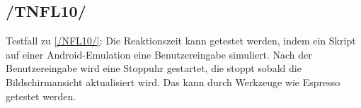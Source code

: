 \subsection*{/TNFL10/}
\label{/TNFL10/} Testfall zu \ref{/NFL10/}: Die Reaktionszeit kann getestet werden, indem ein \Gls{Skript} auf einer \Gls{Android}-\Gls{Emulation} eine Benutzereingabe simuliert.
Nach der Benutzereingabe wird eine Stoppuhr gestartet, die stoppt sobald die Bildschirmansicht aktualisiert wird.
Das kann durch Werkzeuge wie \Gls{Espresso} getestet werden.